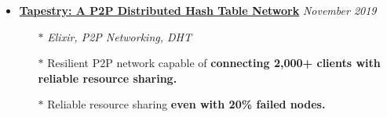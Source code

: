\documentclass[10pt,a4paper]{article}
\begin{document}
\begin{itemize}[noitemsep,nolistsep]
		\item{\textbf{\href{https://github.com/r0ck3r008/tapestry\_p2p}{Tapestry: A P2P Distributed Hash Table Network}} \hfill \textit{November 2019}}
			\begin{itemize}[leftmargin=*]
				\setlength\itemsep{-0.25em}
				\item[$\ast$]\textit{Elixir, P2P Networking, DHT}
				\item[$\ast$]Resilient P2P network capable of \textbf{connecting 2,000+ clients with reliable resource sharing.}
				\item[$\ast$]Reliable resource sharing \textbf{even with 20\% failed nodes.}
			\end{itemize}

	\end{itemize}
\end{document}
